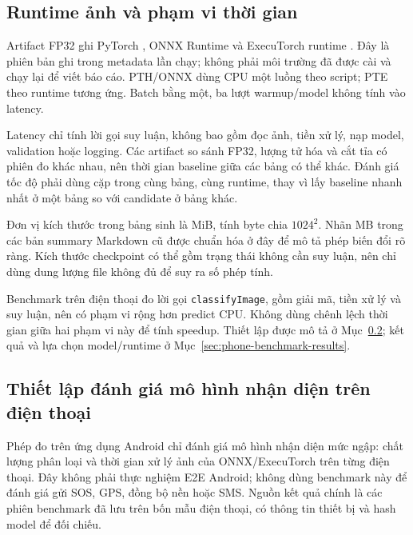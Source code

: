 \subsection{Runtime ảnh và phạm vi thời gian}
Artifact FP32 ghi PyTorch \BenchmarkPytorchVersion{}, ONNX Runtime \BenchmarkOnnxVersion{} và ExecuTorch runtime \BenchmarkExecutorchVersion{}. Đây là phiên bản ghi trong metadata lần chạy; không phải môi trường đã được cài và chạy lại để viết báo cáo. PTH/ONNX dùng CPU một luồng theo script; PTE theo runtime tương ứng. Batch bằng một, ba lượt warmup/model không tính vào latency.

Latency chỉ tính lời gọi suy luận, không bao gồm đọc ảnh, tiền xử lý, nạp model, validation hoặc logging. Các artifact so sánh FP32, lượng tử hóa và cắt tỉa có phiên đo khác nhau, nên thời gian baseline giữa các bảng có thể khác. Đánh giá tốc độ phải dùng cặp trong cùng bảng, cùng runtime, thay vì lấy baseline nhanh nhất ở một bảng so với candidate ở bảng khác.

Đơn vị kích thước trong bảng sinh là MiB, tính byte chia $1024^2$. Nhãn MB trong các bản summary Markdown cũ được chuẩn hóa ở đây để mô tả phép biến đổi rõ ràng. Kích thước checkpoint có thể gồm trạng thái không cần suy luận, nên chỉ dùng dung lượng file không đủ để suy ra số phép tính.

Benchmark trên điện thoại đo lời gọi \texttt{classifyImage}, gồm giải mã, tiền xử lý và suy luận, nên có phạm vi rộng hơn predict CPU. Không dùng chênh lệch thời gian giữa hai phạm vi này để tính speedup. Thiết lập được mô tả ở Mục~\ref{sec:phone-benchmark-setup}; kết quả và lựa chọn model/runtime ở Mục~\ref{sec:phone-benchmark-results}.

\subsection{Thiết lập đánh giá mô hình nhận diện trên điện thoại}\label{sec:phone-benchmark-setup}
Phép đo trên ứng dụng Android chỉ đánh giá mô hình nhận diện mức ngập: chất lượng phân loại và thời gian xử lý ảnh của ONNX/ExecuTorch trên từng điện thoại. Đây không phải thực nghiệm E2E Android; không dùng benchmark này để đánh giá gửi SOS, GPS, đồng bộ nền hoặc SMS. Nguồn kết quả chính là các phiên benchmark đã lưu trên bốn mẫu điện thoại, có thông tin thiết bị và hash model để đối chiếu.

